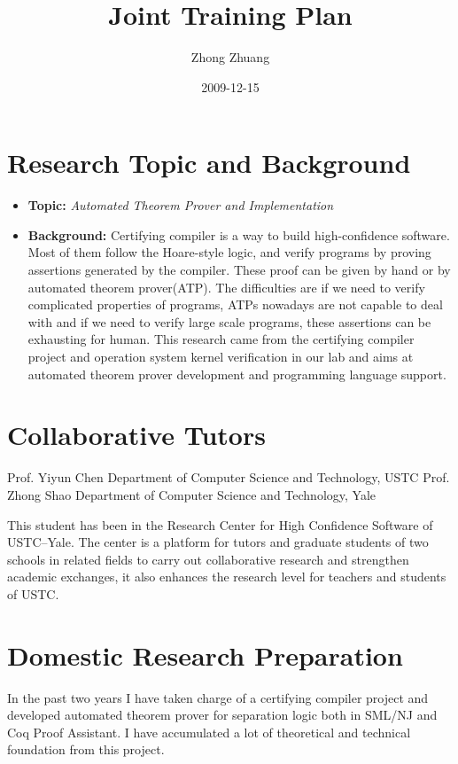 \documentclass{article}
\begin{document}
\title{Joint Training Plan}
\author{Zhong Zhuang}
\date{2009-12-15 }
\maketitle




\section{Research Topic and Background}
\label{sec-1}

\begin{itemize}
\item \textbf{Topic:} \emph{Automated Theorem Prover and Implementation}
\item \textbf{Background:} Certifying compiler is a way to build high-confidence software. Most of them follow the Hoare-style logic, 
    and verify programs by proving assertions generated by the compiler. These proof can be given by hand or by 
    automated theorem prover(ATP). The difficulties are if we need to verify complicated 
    properties of programs, ATPs nowadays are not capable to deal with and if we need to 
    verify large scale programs, these assertions can be exhausting for human. This research 
    came from the certifying compiler project and operation system kernel verification in our lab and aims at
    automated theorem prover development and programming language support.
\end{itemize}
\section{Collaborative Tutors}
\label{sec-2}

  Prof. Yiyun Chen  Department of Computer Science and Technology, USTC
  Prof. Zhong Shao  Department of Computer Science and Technology, Yale

  This student has been in the Research Center for High Confidence Software of
  USTC--Yale. The center is a platform for tutors and graduate students of two
  schools in related fields to carry out collaborative research and strengthen
  academic exchanges, it also enhances the research level for teachers and students
  of USTC.
\section{Domestic Research Preparation}
\label{sec-3}

  In the past two years I have taken charge of a certifying compiler project and developed 
  automated theorem prover for separation logic both in SML/NJ and Coq Proof Assistant. 
  I have accumulated a lot of theoretical and technical foundation from this project.
\end{document}
